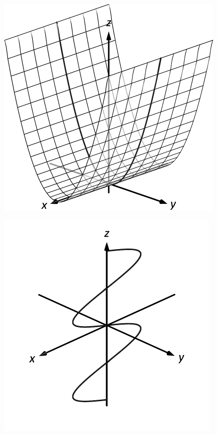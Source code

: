 \documentclass[10pt]{article}
\begin{document}
\includegraphics{figspace4c_3DBW.pdf}
\texttt{}

\includegraphics{figspace4d_3DBW.pdf}
\texttt{}
\end{document}
